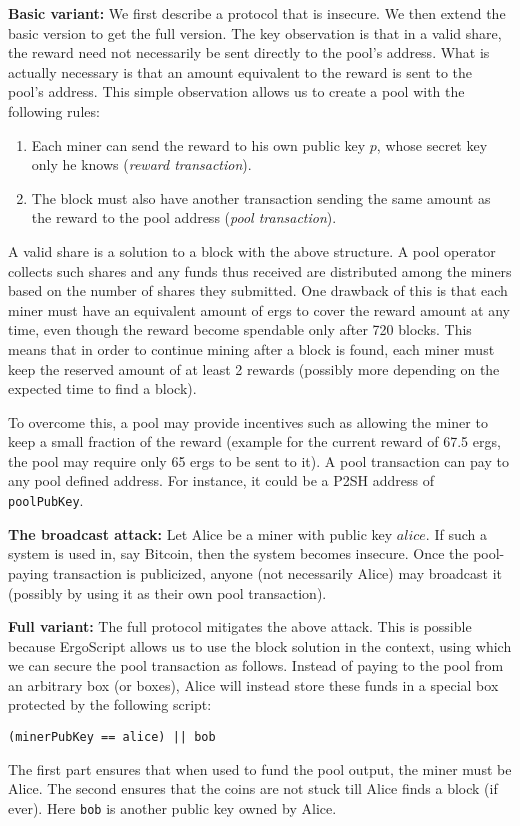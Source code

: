 \documentclass[11pt]{article}
\newcommand{\langname}{ErgoScript\xspace}
\begin{document}
\textbf{Basic variant:} We first describe a protocol that is insecure. We then extend the basic version to get the full version. The key observation is that in a valid share, the reward need not necessarily be sent directly to the pool's address. What is actually necessary is that an amount equivalent to the reward is sent to the pool's address. This simple observation allows us to create a pool with the following rules:
\begin{enumerate}
	\item Each miner can send the reward to his own public key $p$, whose secret key only he knows ({\em reward transaction}).
	\item The block must also have another transaction sending the same amount as the reward to the pool address ({\em pool transaction}).
\end{enumerate}

A valid share is a solution to a block with the above structure. A pool operator collects such shares and any funds thus received are distributed among the miners based on the number of shares they submitted. One drawback of this is that each miner must have an equivalent amount of ergs to cover the reward amount at any time, even though the reward become spendable only after 720 blocks. 
This means that in order to continue mining after a block is found, each miner must keep the reserved amount of at least 2 rewards (possibly more depending on the expected time to find a block).

 To overcome this, a pool may provide incentives such as allowing the miner to keep a small fraction of the reward (example for the current reward of 67.5 ergs, the pool may require only 65 ergs to be sent to it). A pool transaction can pay to any pool defined address. For instance, it could be a P2SH address of \texttt{poolPubKey}. 


\textbf{The broadcast attack:} Let Alice be a miner with public key $alice$. If such a system is used in, say Bitcoin, then the system becomes insecure. Once the pool-paying transaction is publicized, anyone (not necessarily Alice) may broadcast it (possibly by using it as their own pool transaction). 

\textbf{Full variant:} The full protocol mitigates the above attack. This is possible because \langname allows us to use the block solution in the context, using which we can secure the pool transaction as follows. Instead of paying to the pool from an arbitrary box (or boxes), Alice will instead store these funds in a special box protected by the following script:
\begin{verbatim}
(minerPubKey == alice) || bob
\end{verbatim}
The first part ensures that when used to fund the pool output, the miner must be Alice. The second ensures that the coins are not stuck till Alice finds a block (if ever). Here \texttt{bob} is another public key owned by Alice.
\end{document}

